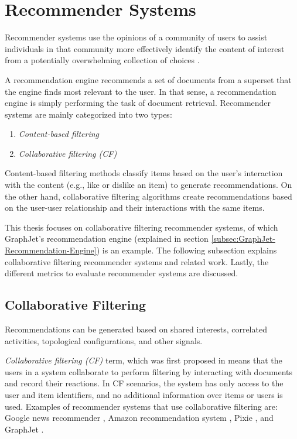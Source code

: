 \section{Recommender Systems}
\label{sec:recommender-systems}

Recommender systems use the opinions of a community of users to assist individuals in that community more effectively identify the content of interest from a potentially overwhelming collection of choices \cite{gunawardanaSurveyAccuracyEvaluation}.

A recommendation engine recommends a set of documents from a superset that the engine finds most relevant to the user. In that sense, a recommendation engine is simply performing the task of document retrieval. Recommender systems are mainly categorized into two types:
\begin{enumerate}
    \item \emph{Content-based filtering}
    \item \emph{Collaborative filtering (CF)}
\end{enumerate}

Content-based filtering methods classify items based on the user's interaction with the content (e.g., like or dislike an item) to generate recommendations. On the other hand, collaborative filtering algorithms create recommendations based on the user-user relationship and their interactions with the same items.


This thesis focuses on collaborative filtering recommender systems, of which GraphJet's recommendation engine \cite{sharmaGraphJetRealtimeContent2016} (explained in section \ref{subsec:GraphJet-Recommendation-Engine}) is an example.
The following subsection explains collaborative filtering recommender systems and related work. Lastly, the different metrics to evaluate recommender systems are discussed.

\subsection{Collaborative Filtering}
\label{subsec:collaborative-filtering}

Recommendations can be generated based on shared interests, correlated activities, topological configurations, and other signals.

\emph{Collaborative filtering (CF)} term, which was first proposed in \cite{goldbergUsingCollaborativeFiltering1992} means that the users in a system collaborate to perform filtering by interacting with documents and record their reactions.
In CF scenarios, the system has only access to the user and item identifiers, and no additional information over items or users is used.
Examples of recommender systems that use collaborative filtering are: Google news recommender \cite{dasGoogleNewsPersonalization2007}, Amazon recommendation system \cite{lindenAmazonComRecommendations2003}, Pixie \cite{eksombatchaiPixieSystemRecommending2018}, and GraphJet \cite{sharmaGraphJetRealtimeContent2016}.

